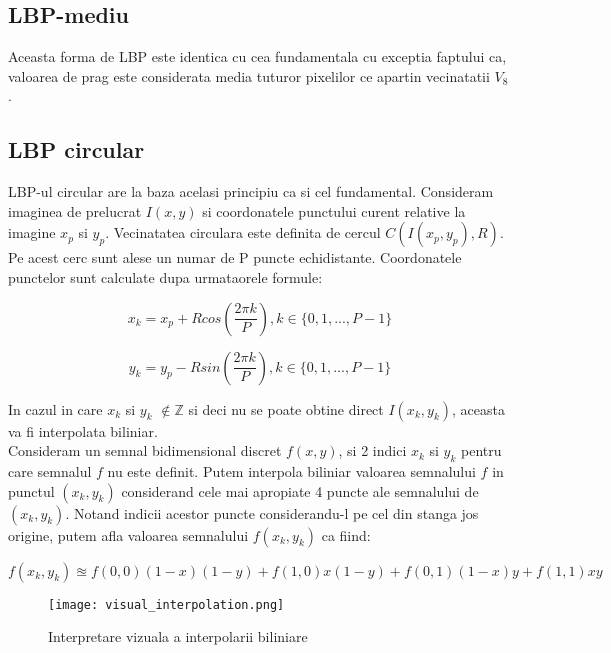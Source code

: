 \subsection{LBP-mediu}

\quad Aceasta forma de LBP este identica cu cea fundamentala cu exceptia
faptului ca, valoarea de prag este considerata media tuturor pixelilor
ce apartin vecinatatii $V_8$.


\subsection{LBP circular}

\quad LBP-ul circular are la baza acelasi principiu ca si cel
fundamental. Consideram imaginea de prelucrat $I(x,y)$ si coordonatele
punctului curent relative la imagine $x_p$ si $y_p$. Vecinatatea 
circulara este definita de cercul $C(I(x_p,y_p), R)$. Pe acest 
cerc sunt alese un numar de P puncte echidistante. Coordonatele 
punctelor sunt calculate dupa urmataorele formule:
	
\begin{equation}
	x_k = x_p + Rcos(\frac{2 \pi k}{P}), k \in {\{0,1,...,P-1\}}
\end{equation}

\begin{equation}
	y_k = y_p - Rsin(\frac{2 \pi k}{P}), k \in {\{0,1,...,P-1\}}
\end{equation}

In cazul in care $x_k$ si $y_k$ $\notin \mathbb{Z}$ si deci nu se 
poate obtine direct $ I(x_k, y_k) $, aceasta va fi interpolata 
biliniar. \\

Consideram un semnal bidimensional discret $ f(x,y) $, si 2 
indici $x_k$ si $y_k$ pentru care semnalul $ f $ nu este
definit. Putem interpola biliniar valoarea semnalului $ f $
in punctul $(x_k ,y_k)$ considerand cele mai apropiate 4 puncte ale semnalului
de $(x_k ,y_k)$. Notand indicii acestor puncte considerandu-l pe
cel din stanga jos origine, putem afla valoarea semnalului 
$f(x_k ,y_k)$ ca fiind: 

\begin{equation}
	f(x_k ,y_k) \approxeq f(0,0)(1-x)(1-y) + f(1,0)x(1-y) + f(0,1)(1-x)y
	+ f(1,1)xy
\end{equation}

\begin{figure}[H]
	\texttt{[image: visual\_interpolation.png]}
	\centering
	\caption{Interpretare vizuala a interpolarii biliniare}
\end{figure}

